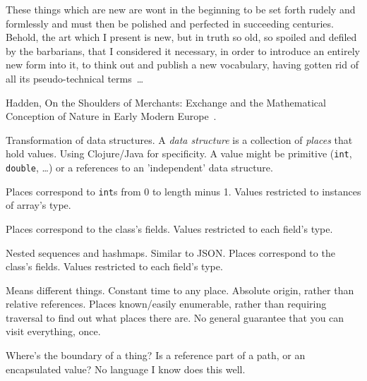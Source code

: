 \setcounter{currentlevel}{\value{baseSectionLevel}}
\epigraph{These things which are new are wont in the beginning to 
be set 
forth rudely and formlessly and must then be polished and 
perfected in succeeding centuries. Behold, the art which I present 
is new, but in truth so old, so spoiled and defiled by the 
barbarians, that I considered it necessary, in order to introduce
an entirely new form into it, to think out and publish a new 
vocabulary, having gotten rid of all its pseudo-technical 
terms~\ldots}
{Hadden, On the Shoulders of Merchants: 
Exchange and the Mathematical Conception of Nature in Early 
Modern Europe~\cite{hadden1994shoulders}.}
Transformation of data structures.
A \textit{data structure} is a collection of \textit{places}
that hold values. 
Using Clojure/Java for specificity.
A value might be primitive
(\texttt{int}, \texttt{double}, \ldots)
or a references to an 'independent' data structure.

\begin{example}
Places correspond to \texttt{int}s from 0 to length minus 1.
Values restricted to instances of array's type.
\end{example}  

\begin{example}
Places correspond to the class's fields.
Values restricted to each field's type.
\end{example}  

\begin{example}
Nested sequences and hashmaps. Similar to JSON.
Places correspond to the class's fields.
Values restricted to each field's type.
\end{example}  


Means different things. 
Constant time to any place.
Absolute origin, rather than relative references.
Places known/easily enumerable, rather than requiring traversal
to find out what places there are.
No general guarantee that you can visit everything, once.

Where's the boundary of a thing? 
Is a reference part of a path, or
an encapsulated value?
No language I know does this well.

